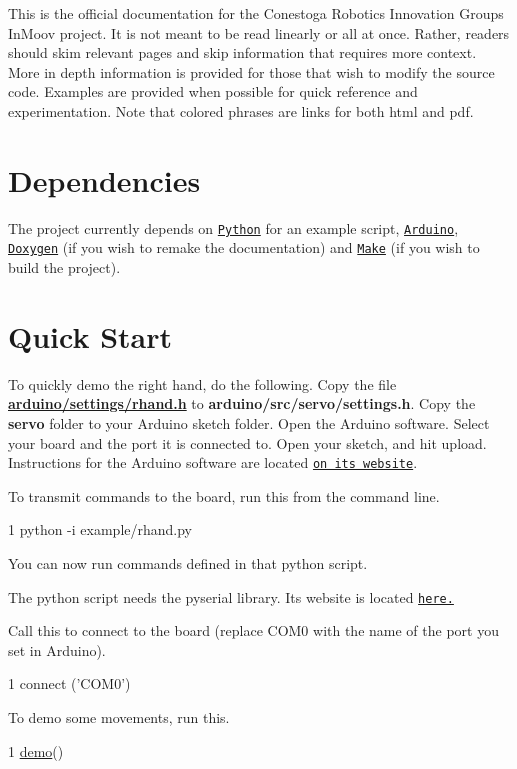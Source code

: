 This is the official documentation for the Conestoga Robotics Innovation Group\textquotesingle{}s In\+Moov project. It is not meant to be read linearly or all at once. Rather, readers should skim relevant pages and skip information that requires more context. More in depth information is provided for those that wish to modify the source code. Examples are provided when possible for quick reference and experimentation. Note that colored phrases are links for both html and pdf.\hypertarget{index_Dependencies}{}\section{Dependencies}\label{index_Dependencies}
The project currently depends on \href{http://www.python.org}{\tt Python} for an example script, \href{http://www.arduino.cc}{\tt Arduino}, \href{http://www.stack.nl/~dimitri/doxygen/}{\tt Doxygen} (if you wish to remake the documentation) and \href{http://www.gnu.org/software/make/}{\tt Make} (if you wish to build the project).\hypertarget{index_Quick_Start}{}\section{Quick Start}\label{index_Quick_Start}
To quickly demo the right hand, do the following. Copy the file {\bfseries \hyperlink{rhand_8h}{arduino/settings/rhand.\+h}} to {\bfseries arduino/src/servo/settings.\+h}. Copy the {\bfseries servo} folder to your Arduino sketch folder. Open the Arduino software. Select your board and the port it is connected to. Open your sketch, and hit upload. Instructions for the Arduino software are located \href{http://www.arduino.cc}{\tt on its website}.

To transmit commands to the board, run this from the command line. 
\begin{DoxyCode}
1 python -i example/rhand.py
\end{DoxyCode}
 You can now run commands defined in that python script.

The python script needs the pyserial library. Its website is located \href{http://pyserial.sourceforge.net/}{\tt here.}

Call this to connect to the board (replace C\+O\+M0 with the name of the port you set in Arduino). 
\begin{DoxyCode}
1 connect (\textcolor{stringliteral}{'COM0'})
\end{DoxyCode}


To demo some movements, run this. 
\begin{DoxyCode}
1 \hyperlink{namespacerhand_ab61f76a347c39c86870720263e1ffbdc}{demo}()
\end{DoxyCode}


